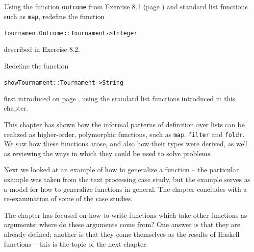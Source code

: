 \begin{exercises}

\item
Using the function \texttt{outcome} from Exercise 8.1 (page \pageref{outcome})
and standard list functions such as \texttt{map}, redefine the function
\begin{alltt}
tournamentOutcome :: Tournament -> Integer
\end{alltt}
described in Exercise 8.2.

\item
Redefine the function
\begin{alltt}
showTournament :: Tournament -> String
\end{alltt}
first introduced on page \pageref{showTournament}, using the standard list functions introduced in this chapter.



\end{exercises} 



\begin{summary}
This chapter has shown how the informal patterns of definition over
lists can be realized as higher-order, polymorphic functions, such as
\texttt{map}, \texttt{filter} and \texttt{foldr}. We saw how these
functions arose, and also how their types were derived, as well as
reviewing the ways in which they could be used to solve problems.

Next we looked at an example of how to generalize a function -- the
particular example was taken from the text processing case study, but
the example serves as a model for how to generalize functions in
general. The chapter concludes with a re-examination of some of the case studies.

The chapter has focused on how to write functions which take other
functions as arguments; where do these arguments come from? One answer
is that they are already defined; another is that they come themselves
as the results of Haskell functions -- this is the topic of the next
chapter.

\end{summary}


%
